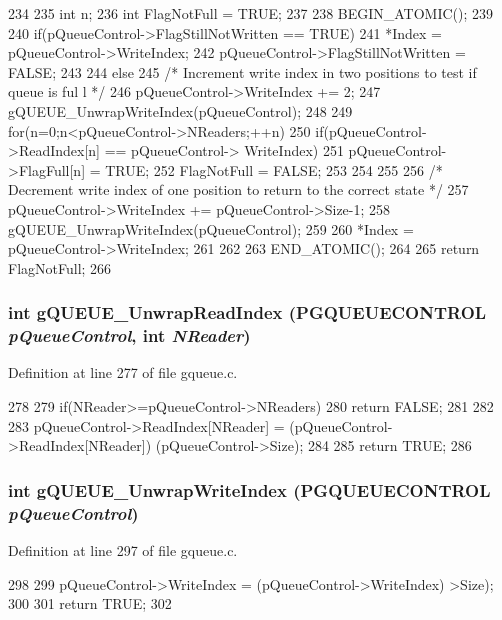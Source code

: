 \begin{DoxyCode}
234 {
235         int n;
236         int     FlagNotFull = TRUE;
237 
238 BEGIN_ATOMIC();
239     
240     if(pQueueControl->FlagStillNotWritten == TRUE){
241         *Index = pQueueControl->WriteIndex;
242         pQueueControl->FlagStillNotWritten = FALSE;
243         }
244     else{
245                 /* Increment write index in two positions to test if queue is ful
      l */
246         pQueueControl->WriteIndex += 2; 
247         gQUEUE_UnwrapWriteIndex(pQueueControl);
248         
249                 for(n=0;n<pQueueControl->NReaders;++n){    
250                         if(pQueueControl->ReadIndex[n] == pQueueControl->
      WriteIndex){
251                                 pQueueControl->FlagFull[n] = TRUE;
252                                 FlagNotFull = FALSE;
253                         }
254                 }
255 
256                 /* Decrement write index of one position to return to the correct
       state */
257         pQueueControl->WriteIndex += pQueueControl->Size-1; 
258         gQUEUE_UnwrapWriteIndex(pQueueControl);
259 
260                 *Index = pQueueControl->WriteIndex;
261     }
262 
263 END_ATOMIC();
264 
265     return FlagNotFull;
266 }                      
\end{DoxyCode}
\subsubsection[{gQUEUE\_\-UnwrapReadIndex}]{\setlength{\rightskip}{0pt plus 5cm}int gQUEUE\_\-UnwrapReadIndex ({\bf PGQUEUECONTROL} {\em pQueueControl}, \/  int {\em NReader})}\label{gqueue_8h_abab4c6aeb3d57e43aa16285fe4f59f66}


Definition at line 277 of file gqueue.c.


\begin{DoxyCode}
278 {
279         if(NReader>=pQueueControl->NReaders){
280                 return FALSE;
281         }
282 
283         pQueueControl->ReadIndex[NReader] = (pQueueControl->ReadIndex[NReader]) %
       (pQueueControl->Size); 
284   
285         return TRUE;
286 }                      
\end{DoxyCode}
\subsubsection[{gQUEUE\_\-UnwrapWriteIndex}]{\setlength{\rightskip}{0pt plus 5cm}int gQUEUE\_\-UnwrapWriteIndex ({\bf PGQUEUECONTROL} {\em pQueueControl})}\label{gqueue_8h_a070de567ba00fb02d6c480840c15d31d}


Definition at line 297 of file gqueue.c.


\begin{DoxyCode}
298 {
299         pQueueControl->WriteIndex = (pQueueControl->WriteIndex) %
      >Size); 
300         
301         return TRUE;
302 }                      
\end{DoxyCode}
